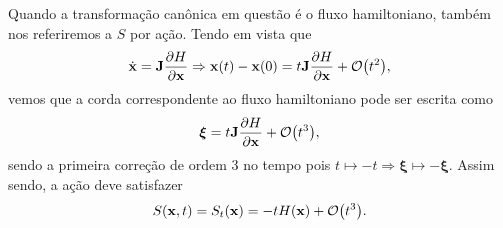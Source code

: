 \documentclass[
	12pt,
	oneside,			%
	a4paper,			%
	english,			%
	brazil				%
	]{abntex2}
\theoremstyle{definition}
\begin{document}
Quando a transformação canônica em questão é o fluxo hamiltoniano, também nos referiremos a $S$ por ação. Tendo em vista que
\begin{equation}
    \dot{\mathbf{x}} = \mathbf{J} \frac{\partial H}{\partial \mathbf{x}} \Rightarrow \mathbf{x}(t) - \mathbf{x}(0) = t\mathbf{J} \frac{\partial H}{\partial \mathbf{x}} + \order{t^2},
\end{equation}
vemos que a corda correspondente ao fluxo hamiltoniano pode ser escrita como
\begin{equation}
    \boldsymbol{\xi} = t\mathbf{J} \frac{\partial H}{\partial \mathbf{x}} + \order{t^3},
\end{equation}
sendo a primeira correção de ordem $3$ no tempo pois $t \mapsto -t \Rightarrow \boldsymbol{\xi} \mapsto -\boldsymbol{\xi}$. Assim sendo, a ação deve satisfazer
\begin{equation}
\label{ação primeira ordem}
    S(\mathbf{x},t) = S_t(\mathbf{x}) = -tH(\mathbf{x}) + \order{t^3}.
\end{equation}
\end{document}

